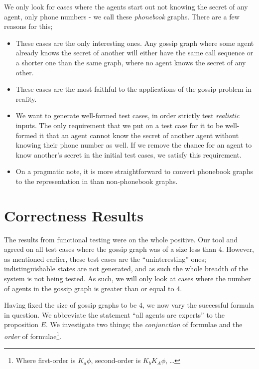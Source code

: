 \documentclass[10pt, a4paper]{report}
\begin{document}
We only look for cases where the agents start out not knowing the secret 
of any agent, only phone numbers - we call these \emph{phonebook} graphs.
There are a few reasons for this;

\begin{itemize}
\item These cases are the only interesting ones. Any gossip graph where some
  agent already knows the secret of another will either have the same call
  sequence or a shorter one than the same graph, where no agent knows the secret
  of any other.
\item These cases are the most faithful to the applications of the gossip
  problem in reality.
\item We want to generate well-formed test cases, in order strictly test
  \emph{realistic} inputs. The only requirement that we put on a test case for
  it to be well-formed it that an agent cannot know the secret of another agent
  without knowing their phone number as well. If we remove the chance for an
  agent to know another's secret in the initial test cases, we satisfy this
  requirement. 
\item On a pragmatic note, it is more straightforward to convert phonebook
  graphs to the representation in \cite{GithubGossip} than non-phonebook graphs.
\end{itemize}

\section{Correctness Results}

The results from functional testing were on the whole positive. Our tool and
\cite{GithubGossip} agreed on all test cases where the gossip graph was of a
size less than 4. However, as mentioned earlier, these test cases are the
``uninteresting'' ones; indistinguishable states are not generated, and as such
the whole breadth of the system is not being tested. As such, we will only look
at cases where the number of agents in the gossip graph is greater than or equal
to 4. 

Having fixed the size of gossip graphs to be 4, we now vary the successful
formula in question. We abbreviate the statement ``all agents are experts'' to
the proposition $E$. We investigate two things; the \emph{conjunction} of
formulae and the \emph{order} of formulae\footnote{Where first-order is $K_a
  \phi$, second-order is $K_b K_A \phi$, \ldots}. 

\end{document}
